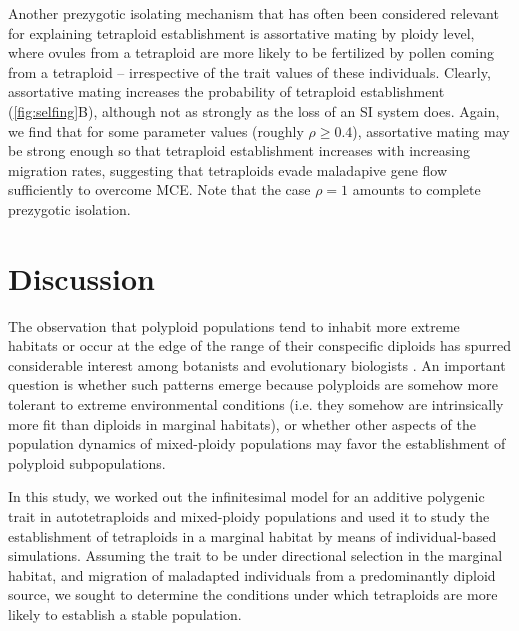 \documentclass[12pt,a4paper]{article}
\begin{document}
Another prezygotic isolating mechanism that has often been considered relevant
for explaining tetraploid establishment is assortative mating by ploidy level,
where ovules from a tetraploid are more likely to be fertilized by
pollen coming from a tetraploid -- irrespective of the trait values of these
individuals.
Clearly, assortative mating increases the probability of tetraploid
establishment (\cref{fig:selfing}B), although not as strongly as the loss of an SI
system does.
Again, we find that for some parameter values (roughly $\rho \ge 0.4$),
assortative mating may be strong enough so that tetraploid establishment
increases with increasing migration rates, suggesting that tetraploids evade
maladapive gene flow sufficiently to overcome MCE.
Note that the case $\rho = 1$ amounts to complete prezygotic isolation.

\section*{Discussion}

The observation that polyploid populations tend to inhabit more extreme
habitats or occur at the edge of the range of their conspecific diploids
has spurred considerable interest among botanists and evolutionary biologists
\citep{rice2015,kolar2017,vandepeer2021,griswold2021,mortier2024}.
An important question is whether such patterns emerge because polyploids are
somehow more tolerant to extreme environmental conditions (i.e. they somehow
are intrinsically more fit than diploids in marginal habitats), or whether other
aspects of the population dynamics of mixed-ploidy populations may favor the
establishment of polyploid subpopulations.

In this study, we worked out the infinitesimal model for an additive polygenic
trait in autotetraploids and mixed-ploidy populations and used it to study the
establishment of tetraploids in a marginal habitat by means of individual-based
simulations.
Assuming the trait to be under directional selection in the marginal habitat,
and migration of maladapted individuals from a predominantly diploid source,
we sought to determine the conditions under which tetraploids are more likely
to establish a stable population.
\end{document}
